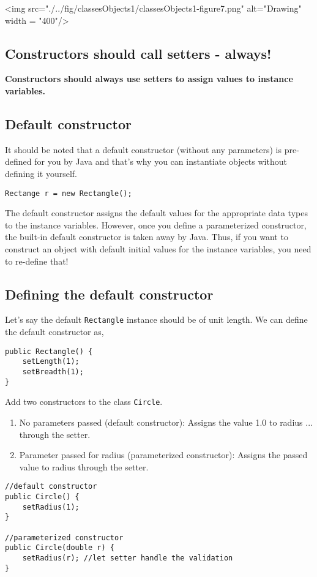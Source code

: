\vskip 0.1cm
\begin{center}
		<img src="./../fig/classesObjects1/classesObjects1-figure7.png" alt="Drawing" width = "400"/> 
\end{center}
\vskip 0.1cm

\subsection{Constructors should call setters - always!}

\textbf{Constructors should \color{red}always \color{black} use setters to assign values to instance variables.}

\subsection{Default constructor}

It should be noted that a default constructor (without any parameters) is pre-defined for you by Java and that's why you can instantiate objects without defining it yourself.

\begin{lstlisting}
Rectange r = new Rectangle();
\end{lstlisting}

The default constructor assigns the default values for the appropriate data types to the instance variables. However, once you define a parameterized constructor, the built-in default constructor is taken away by Java. Thus, if you want to construct an object with default initial values for the instance variables, you need to re-define that!


\subsection{Defining the default constructor}

Let's say the default \texttt{Rectangle} instance should be of unit length. We can define the default constructor as,
\begin{lstlisting}
public Rectangle() {
	setLength(1);
	setBreadth(1);
}
\end{lstlisting}

\begin{exercise}
Add two constructors to the class \texttt{Circle}.
\begin{enumerate}
\item No parameters passed (default constructor): Assigns the value 1.0 to radius ... through the setter.
\item Parameter passed for radius (parameterized constructor): Assigns the passed value to radius through the setter.
\end{enumerate}
\end{exercise}
\begin{answer} \begin{lstlisting}
//default constructor
public Circle() {
	setRadius(1);
}

//parameterized constructor
public Circle(double r) {
	setRadius(r); //let setter handle the validation
}
\end{lstlisting} \end{answer}


